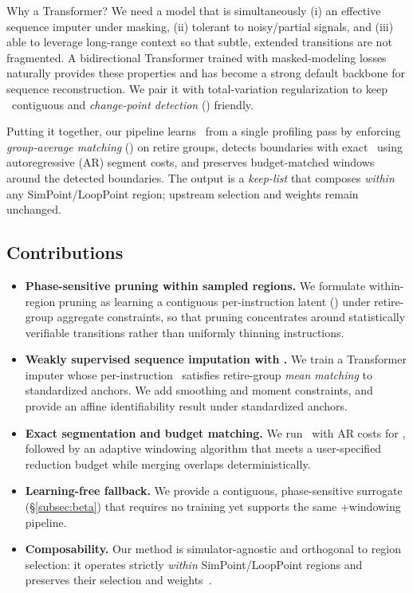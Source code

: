 Why a Transformer? We need a model that is simultaneously (i) an effective sequence imputer under masking, (ii) tolerant to noisy/partial signals, and (iii) able to leverage long-range context so that subtle, extended transitions are not fragmented. A bidirectional Transformer trained with masked-modeling losses naturally provides these properties and has become a strong default backbone for sequence reconstruction. We pair it with total-variation regularization to keep \pts\ contiguous and \emph{change-point detection} (\cpd) friendly.

Putting it together, our pipeline learns \pts\ from a single profiling pass by enforcing \emph{group-average matching} (\gam) on retire groups, detects boundaries with exact \pelt\ using autoregressive (AR) segment costs, and preserves budget-matched windows around the detected boundaries. The output is a \emph{keep-list} that composes \emph{within} any SimPoint/LoopPoint region; upstream selection and weights remain unchanged.

\subsection*{Contributions}
\begin{itemize}[leftmargin=*,noitemsep,topsep=1pt]
  \item \textbf{Phase-sensitive pruning within sampled regions.} We formulate within-region pruning as learning a contiguous per-instruction latent (\pts) under retire-group aggregate constraints, so that pruning concentrates around statistically verifiable transitions rather than uniformly thinning instructions.
  \item \textbf{Weakly supervised sequence imputation with \gam.} We train a Transformer imputer whose per-instruction \pts\ satisfies retire-group \emph{mean matching} to standardized anchors. We add smoothing and moment constraints, and provide an affine identifiability result under standardized anchors.
  \item \textbf{Exact segmentation and budget matching.} We run \pelt\ with AR costs for \cpd, followed by an adaptive windowing algorithm that meets a user-specified reduction budget while merging overlaps deterministically.
  \item \textbf{Learning-free fallback.} We provide a contiguous, phase-sensitive surrogate (\S\ref{subsec:beta}) that requires no training yet supports the same \cpd+windowing pipeline.
  \item \textbf{Composability.} Our method is simulator-agnostic and orthogonal to region selection: it operates strictly \emph{within} SimPoint/LoopPoint regions and preserves their selection and weights~\cite{simpoint-asplos02,simpoint03,simpoint-howto,looppoint}. 
\end{itemize}

